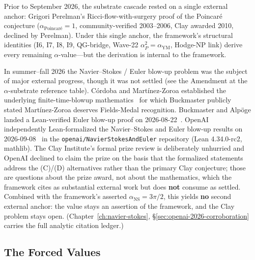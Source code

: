 Prior to September 2026, the substrate cascade rested on a single
external anchor: Grigori Perelman's Ricci-flow-with-surgery proof of
the Poincar\'e conjecture ($\alpha_{\text{Poincar\'e}} = 1$,
community-verified 2003--2006, Clay awarded 2010, declined by Perelman).
Under this single anchor, the framework's structural identities
(I6, I7, I8, I9, QG-bridge, Wave-22 $\alpha_P^2 = \alpha_{\text{YM}}$,
Hodge-NP link) derive every remaining $\alpha$-value---but the
derivation is internal to the framework.

In summer--fall 2026 the Navier--Stokes / Euler blow-up problem was the
subject of major external progress, though it was not settled (see the
Amendment at the $\alpha$-substrate reference table). C\'ordoba and
Mart\'inez-Zoroa established the underlying
finite-time-blowup mathematics~\cite{cordoba-martinezzoroa2026ipm,%
cordoba-martinezzoroa-zheng2026hns} for which Buckmaster publicly
stated Mart\'inez-Zoroa deserves Fields-Medal recognition. Buckmaster
and Alp\"oge landed a Lean-verified Euler blow-up proof on
2026-08-22~\cite{buckmaster-alpoge2026euler}. OpenAI independently
Lean-formalized the Navier--Stokes and Euler blow-up results on
2026-09-08~\cite{openai2026navierstokes,openai2026navierstokeslean}
in the \texttt{openai/NavierStokesAndEuler} repository
(Lean 4.34.0-rc2, mathlib). The Clay Institute's formal prize review
is deliberately unhurried and OpenAI declined to claim the prize on
the basis that the formalized statements address the (C)/(D)
alternatives rather than the primary Clay conjecture; those are
questions about the prize award, not about the mathematics, which
the framework cites as substantial external work but does \textbf{not}
consume as settled. Combined with the framework's asserted
$\alpha_{\text{NS}} = 3\pi/2$, this yields \textbf{no} second external anchor:
the value stays an assertion of the framework, and the Clay problem stays
open. (Chapter~\ref{ch:navier-stokes},
\S\ref{sec:openai-2026-corroboration} carries the full analytic
citation ledger.)

\subsection{The Forced Values}

